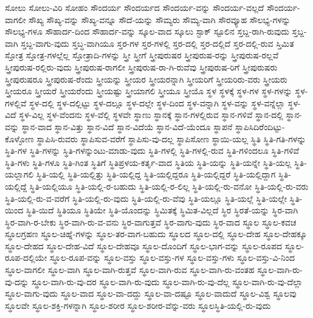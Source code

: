 {ಸೋಲು
ಸೋಲು-ವಿರಿ
ಸೋಹಂ
ಸೌಂದರ್ಯ
ಸೌಂದರ್ಯದ
ಸೌಂದರ್ಯ-ವನ್ನು
ಸೌಂದರ್ಯ-ವಲ್ಲದೆ
ಸೌಂದರ್ಯ-ವಾಗಲೀ
ಸೌಖ್ಯ
ಸೌಖ್ಯ-ವನ್ನು
ಸೌಖ್ಯ-ವನ್ನೂ
ಸೌದೆ-ಯನ್ನು
ಸೌಮ್ಯರು
ಸೌಮ್ಯ-ವಾಗಿ
ಸೌರವ್ಯೂಹ
ಸೌಲಭ್ಯ-ಗಳನ್ನು
ಸೌಲಭ್ಯ-ಗಳೂ
ಸೌಹಾರ್ದ-ದಿಂದ
ಸೌಹಾರ್ದ-ವನ್ನು
ಸ್ಕೂಲ-ವಾದ
ಸ್ಕೂಲು
ಸ್ಟಾಕ್
ಸ್ಟೂಲಿನ
ಸ್ತಬ್ದ-ರಾಗಿ-ರುವುದು
ಸ್ತಬ್ದ-ವಾಗಿ
ಸ್ತಬ್ದ-ವಾಗು-ವುದು
ಸ್ತಬ್ಧ-ವಾಗಿಯೂ
ಸ್ತರ-ಗಳ
ಸ್ತರ-ಗಳಲ್ಲಿ
ಸ್ತರ-ದಲ್ಲಿ
ಸ್ತರ-ದಲ್ಲಿದೆ
ಸ್ತರ-ದಲ್ಲಿ-ರುವ
ಸ್ತಿಮಿತ
ಸ್ತೋತ್ರ
ಸ್ತೋತ್ರ-ಗಳಲ್ಲೆಲ್ಲ
ಸ್ತೋತ್ರಾದಿ-ಗಳನ್ನು
ಸ್ತ್ರೀ
ಸ್ತ್ರೀಗೆ
ಸ್ತ್ರೀಪುರುಷರ
ಸ್ತ್ರೀಪುರುಷ-ರನ್ನು
ಸ್ತ್ರೀಪುರುಷ-ರಲ್ಲವೆ
ಸ್ತ್ರೀಪುರುಷ-ರಲ್ಲಿರು-ವುದು
ಸ್ತ್ರೀಪುರುಷ-ರಾಗಲೀ
ಸ್ತ್ರೀಪುರುಷ-ರಾ-ಗಿ-ರುವೆವು
ಸ್ತ್ರೀಪುರುಷ-ರಿಗೆ
ಸ್ತ್ರೀಪುರುಷರು
ಸ್ತ್ರೀಪುರುಷರೂ
ಸ್ತ್ರೀಪುರುಷ-ರೆಂದು
ಸ್ತ್ರೀಯನ್ನು
ಸ್ತ್ರೀಯರ
ಸ್ತ್ರೀಯರನ್ನಾಗಿ
ಸ್ತ್ರೀಯರಿಗೆ
ಸ್ತ್ರೀಯರಿರು-ವರು
ಸ್ತ್ರೀಯರು
ಸ್ತ್ರೀಯರೂ
ಸ್ತ್ರೀಯರೆ
ಸ್ತ್ರೀಯರೆಂದು
ಸ್ತ್ರೀಯಷ್ಟು
ಸ್ತ್ರೀಯಾಗಲಿ
ಸ್ತ್ರೀಯೂ
ಸ್ತ್ರೀಯೊ
ಸ್ಥಳ
ಸ್ಥಳಕ್ಕೆ
ಸ್ಥಳ-ಗಳ
ಸ್ಥಳ-ಗಳನ್ನು
ಸ್ಥಳ-ಗಳಲ್ಲಿವೆ
ಸ್ಥಳ-ದಲ್ಲಿ
ಸ್ಥಳ-ದಲ್ಲಿಟ್ಟು
ಸ್ಥಳ-ದಲ್ಲೂ
ಸ್ಥಳ-ದಲ್ಲೇ
ಸ್ಥಳ-ದಿಂದ
ಸ್ಥಳ-ವನ್ನಾಗಿ
ಸ್ಥಳ-ವನ್ನು
ಸ್ಥಳ-ವನ್ನೆಲ್ಲಾ
ಸ್ಥಳ-ವಿದೆ
ಸ್ಥಳ-ವಿಲ್ಲ
ಸ್ಥಳ-ವೆಂದನು
ಸ್ಥಳ-ವೆಲ್ಲಿ
ಸ್ಥಳವೇ
ಸ್ಥಾಣು
ಸ್ಥಾನಕ್ಕೆ
ಸ್ಥಾನ-ಗಳಲ್ಲಿರುವ
ಸ್ಥಾನ-ಗಳಿವೆ
ಸ್ಥಾನ-ದಲ್ಲಿ
ಸ್ಥಾನ-ವನ್ನು
ಸ್ಥಾನ-ವಾದ
ಸ್ಥಾನ-ವಿತ್ತು
ಸ್ಥಾನ-ವಿದೆ
ಸ್ಥಾನ-ವಿದೆಯೆ
ಸ್ಥಾನ-ವಿದೆ-ಯೆಂದೂ
ಸ್ಥಾಪನೆ
ಸ್ಥಾಪಿಸಿದಿರೆಂದಿಟ್ಟು-ಕೊಳ್ಳೋಣ
ಸ್ಥಾಪಿಸಿ-ರುವರು
ಸ್ಥಾಪಿಸುವ-ವರೆಗೆ
ಸ್ಥಾಪಿಸು-ವು-ದಲ್ಲ
ಸ್ಥಾಪಿಸೋಣ
ಸ್ಥಾಯಿ-ಯಲ್ಲ
ಸ್ಥಿತಿ
ಸ್ಥಿತಿ-ಗತಿ-ಗಳನ್ನು
ಸ್ಥಿತಿ-ಗಳ
ಸ್ಥಿತಿ-ಗಳನ್ನು
ಸ್ಥಿತಿ-ಗಳನ್ನುಂಟು-ಮಾಡು-ವುದು
ಸ್ಥಿತಿ-ಗಳಲ್ಲಿ
ಸ್ಥಿತಿ-ಗಳಲ್ಲಿ-ರುವ
ಸ್ಥಿತಿ-ಗಳಿಂದಲೂ
ಸ್ಥಿತಿ-ಗಳಿವೆ
ಸ್ಥಿತಿ-ಗಳು
ಸ್ಥಿತಿ-ಗಳೂ
ಸ್ಥಿತಿ-ಗಿಂತ
ಸ್ಥಿತಿಗೆ
ಸ್ಥಿತಿಪ್ರಳಯ-ಕರ್ತೃ-ವಾದ
ಸ್ಥಿತಿಯ
ಸ್ಥಿತಿ-ಯನ್ನು
ಸ್ಥಿತಿ-ಯನ್ನೇ
ಸ್ಥಿತಿ-ಯಲ್ಲ
ಸ್ಥಿತಿ-ಯಲ್ಲಾಗಲಿ
ಸ್ಥಿತಿ-ಯಲ್ಲಿ
ಸ್ಥಿತಿ-ಯಲ್ಲಿತ್ತು
ಸ್ಥಿತಿ-ಯಲ್ಲಿದ್ದ
ಸ್ಥಿತಿ-ಯಲ್ಲಿದ್ದರೂ
ಸ್ಥಿತಿ-ಯಲ್ಲಿದ್ದರೆ
ಸ್ಥಿತಿ-ಯಲ್ಲಿದ್ದಾಗ
ಸ್ಥಿತಿ-ಯಲ್ಲಿದ್ದೆ
ಸ್ಥಿತಿ-ಯಲ್ಲಿಯೂ
ಸ್ಥಿತಿ-ಯಲ್ಲಿ-ರ-ಬಹುದು
ಸ್ಥಿತಿ-ಯಲ್ಲಿ-ರ-ಲಿಲ್ಲ
ಸ್ಥಿತಿ-ಯಲ್ಲಿ-ರು-ವನೋ
ಸ್ಥಿತಿ-ಯಲ್ಲಿ-ರು-ವರು
ಸ್ಥಿತಿ-ಯಲ್ಲಿ-ರು-ವ-ವರೆಗೆ
ಸ್ಥಿತಿ-ಯಲ್ಲಿ-ರು-ವುದು
ಸ್ಥಿತಿ-ಯಲ್ಲಿ-ರು-ವೆವು
ಸ್ಥಿತಿ-ಯಲ್ಲೂ
ಸ್ಥಿತಿ-ಯಲ್ಲೆ
ಸ್ಥಿತಿ-ಯಲ್ಲೇ
ಸ್ಥಿತಿ-ಯಿಂದ
ಸ್ಥಿತಿ-ಯಿದೆ
ಸ್ಥಿತಿಯೂ
ಸ್ಥಿತಿಯೇ
ಸ್ಥಿತಿ-ಯೊಂದನ್ನು
ಸ್ಥಿಮಿತಕ್ಕೆ
ಸ್ಥಿಮಿತ-ವಿಲ್ಲದೆ
ಸ್ಥಿರ
ಸ್ಥಿರತೆ-ಯನ್ನು
ಸ್ಥಿರ-ವಾಗಿ
ಸ್ಥಿರ-ವಾಗಿ-ರ-ಬೇಕು
ಸ್ಥಿರ-ವಾಗಿ-ರು-ವ-ವನು
ಸ್ಥಿರ-ವಾಗುತ್ತವೆ
ಸ್ಥಿರ-ವಾಗು-ವುದು
ಸ್ಥಿರ-ವಾದ
ಸ್ಥೂಲ
ಸ್ಥೂಲ-ಕವಚ
ಸ್ಥೂಲಗ್ರಹಣ
ಸ್ಥೂಲ-ಚಿಹ್ನೆ-ಗಳನ್ನು
ಸ್ಥೂಲ-ತರ-ವಾಗ-ಬಹುದು
ಸ್ಥೂಲದ
ಸ್ಥೂಲ-ದಲ್ಲಿ
ಸ್ಥೂಲ-ದೇಹ
ಸ್ಥೂಲ-ದೇಹಕ್ಕೂ
ಸ್ಥೂಲ-ದೇಹದ
ಸ್ಥೂಲ-ದೇಹ-ವಿದೆ
ಸ್ಥೂಲ-ದೇಹವೂ
ಸ್ಥೂಲ-ದೊಂದಿಗೆ
ಸ್ಥೂಲ-ಭಾಗ-ವನ್ನು
ಸ್ಥೂಲ-ರೂಪದ
ಸ್ಥೂಲ-ರೂಪ-ದಲ್ಲಿಯೇ
ಸ್ಥೂಲ-ರೂಪ-ವನ್ನು
ಸ್ಥೂಲ-ವಸ್ತು
ಸ್ಥೂಲ-ವಸ್ತು-ಗಳ
ಸ್ಥೂಲ-ವಸ್ತು-ಗಳು
ಸ್ಥೂಲ-ವಸ್ತು-ವಿ-ನಿಂದ
ಸ್ಥೂಲ-ವಾಗಲೀ
ಸ್ಥೂಲ-ವಾಗಿ
ಸ್ಥೂಲ-ವಾಗಿ-ರುತ್ತವೆ
ಸ್ಥೂಲ-ವಾಗಿ-ರುವ
ಸ್ಥೂಲ-ವಾಗಿ-ರು-ವಂತಹ
ಸ್ಥೂಲ-ವಾಗಿ-ರು-ವು-ದನ್ನು
ಸ್ಥೂಲ-ವಾಗಿ-ರು-ವು-ದರ
ಸ್ಥೂಲ-ವಾಗಿ-ರು-ವುದು
ಸ್ಥೂಲ-ವಾಗಿ-ರು-ವು-ದೆಲ್ಲ
ಸ್ಥೂಲ-ವಾಗಿ-ರು-ವು-ದೆಲ್ಲಾ
ಸ್ಥೂಲ-ವಾಗು-ವುದು
ಸ್ಥೂಲ-ವಾದ
ಸ್ಥೂಲ-ವಾ-ದದ್ದು
ಸ್ಥೂಲ-ವಾ-ದಷ್ಟೂ
ಸ್ಥೂಲ-ವಾದುದೆ
ಸ್ಥೂಲ-ವಿಶ್ವ
ಸ್ಥೂಲವು
ಸ್ಥೂಲವೇ
ಸ್ಥೂಲ-ಶಕ್ತಿ-ಗಳನ್ನಾಗಿ
ಸ್ಥೂಲ-ಶರೀರ
ಸ್ಥೂಲ-ಶರೀರ-ವೆನ್ನು-ವರು
ಸ್ಥೂಲಸ್ಥಿತಿ-ಯಲ್ಲಿ-ರು-ವುದು
}
